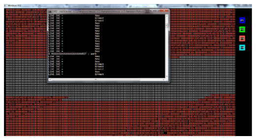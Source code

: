 \begin{center}
\includegraphics[width=14cm, height=7.5cm]{4.eps}
\end{center}

\begin{center} 
\end{center}

\begin{center} 
\end{center}

\begin{center} 
\end{center}
\clearpage

